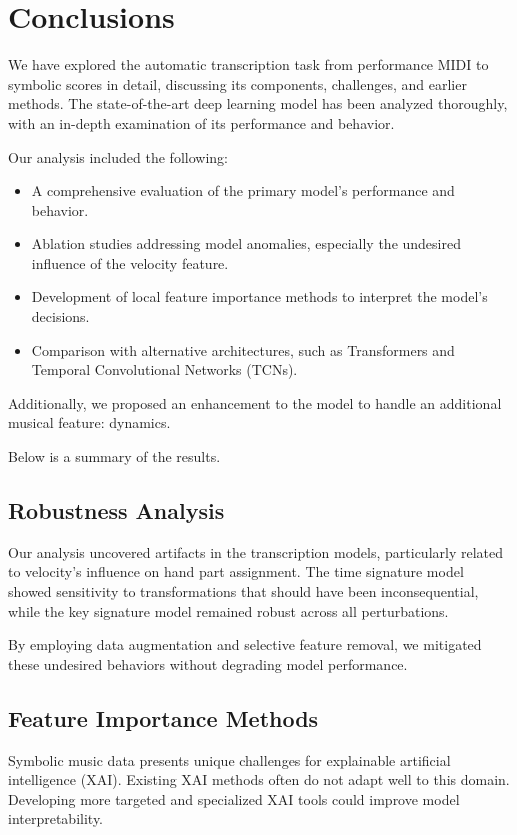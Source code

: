 \chapter{Conclusions}

We have explored the automatic transcription task from performance MIDI to symbolic scores in detail, discussing its components, challenges, and earlier methods. The state-of-the-art deep learning model has been analyzed thoroughly, with an in-depth examination of its performance and behavior.

Our analysis included the following: \begin{itemize}
	\item A comprehensive evaluation of the primary model's performance and behavior.
	\item Ablation studies addressing model anomalies, especially the undesired influence of the velocity feature.
	\item Development of local feature importance methods to interpret the model's decisions.
	\item Comparison with alternative architectures, such as Transformers and Temporal Convolutional Networks (TCNs). \end{itemize}

Additionally, we proposed an enhancement to the model to handle an additional musical feature: dynamics.

Below is a summary of the results.

\section{Robustness Analysis}

Our analysis uncovered artifacts in the transcription models, particularly related to velocity's influence on hand part assignment. The time signature model showed sensitivity to transformations that should have been inconsequential, while the key signature model remained robust across all perturbations.

By employing data augmentation and selective feature removal, we mitigated these undesired behaviors without degrading model performance.

\section{Feature Importance Methods}

Symbolic music data presents unique challenges for explainable artificial intelligence (XAI). Existing XAI methods often do not adapt well to this domain. Developing more targeted and specialized XAI tools could improve model interpretability.


